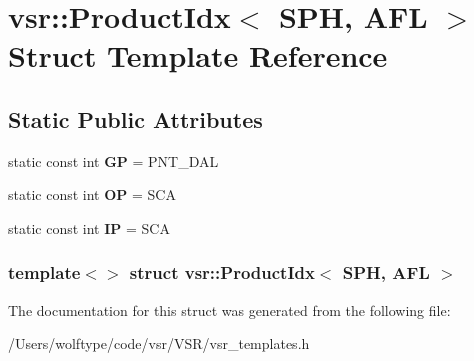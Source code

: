 \hypertarget{structvsr_1_1_product_idx_3_01_s_p_h_00_01_a_f_l_01_4}{\section{vsr\-:\-:Product\-Idx$<$ S\-P\-H, A\-F\-L $>$ Struct Template Reference}
\label{structvsr_1_1_product_idx_3_01_s_p_h_00_01_a_f_l_01_4}
}
\subsection*{Static Public Attributes}
\begin{DoxyCompactItemize}
\item 
\hypertarget{structvsr_1_1_product_idx_3_01_s_p_h_00_01_a_f_l_01_4_ac2dd3b6f21e694e7be5a13caca6de456}{static const int {\bfseries G\-P} = P\-N\-T\-\_\-\-D\-A\-L}\label{structvsr_1_1_product_idx_3_01_s_p_h_00_01_a_f_l_01_4_ac2dd3b6f21e694e7be5a13caca6de456}

\item 
\hypertarget{structvsr_1_1_product_idx_3_01_s_p_h_00_01_a_f_l_01_4_a96cab9c10613523e8e5af87e6c7e940f}{static const int {\bfseries O\-P} = S\-C\-A}\label{structvsr_1_1_product_idx_3_01_s_p_h_00_01_a_f_l_01_4_a96cab9c10613523e8e5af87e6c7e940f}

\item 
\hypertarget{structvsr_1_1_product_idx_3_01_s_p_h_00_01_a_f_l_01_4_a2b62194453e5b93b4a578477eb47a2cb}{static const int {\bfseries I\-P} = S\-C\-A}\label{structvsr_1_1_product_idx_3_01_s_p_h_00_01_a_f_l_01_4_a2b62194453e5b93b4a578477eb47a2cb}

\end{DoxyCompactItemize}
\subsubsection*{template$<$$>$ struct vsr\-::\-Product\-Idx$<$ S\-P\-H, A\-F\-L $>$}



The documentation for this struct was generated from the following file\-:\begin{DoxyCompactItemize}
\item 
/\-Users/wolftype/code/vsr/\-V\-S\-R/vsr\-\_\-templates.\-h\end{DoxyCompactItemize}
